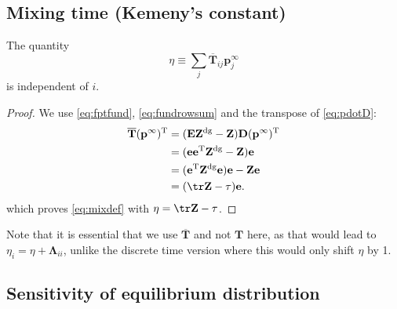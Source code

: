 \documentclass[12pt]{article}
\newcommand{\dg}{^\mathrm{dg}}
\newcommand{\trans}{^\mathrm{T}}
\newcommand{\onev}{\mathbf{e}}
\newcommand{\onem}{\mathbf{E}}
\newcommand{\eq}{\mathbf{p}^\infty}
\newcommand{\fpt}{\mathbf{T}}
\newcommand{\fptb}{\overline{\fpt}}
\newcommand{\fund}{\mathbf{Z}}
\newcommand{\D}{\mathbf{D}}
\newcommand{\Lb}{\boldsymbol{\Lambda}}
\begin{document}
\subsection{Mixing time (Kemeny's constant)}\label{sec:mixtime}

\begin{thm}\label{th:kemenyconst}
  The quantity
  \begin{equation}\label{eq:mixdef}
    \eta \equiv \sum_j \fptb_{ij}\eq_j
  \end{equation}
  is independent of $i$.
\end{thm}
\begin{proof}
  We use \eqref{eq:fptfund}, \eqref{eq:fundrowsum} and the transpose of \eqref{eq:pdotD}:
  \begin{equation*}
    \begin{aligned}
      \fptb (\eq)\trans &= (\onem\fund\dg - \fund) \D (\eq)\trans \\
        &= (\onev\onev\trans\fund\dg - \fund) \onev \\
        &= (\onev\trans\fund\dg\onev)\onev - \fund\onev \\
        &= (\tr\fund - \tau)\onev.
    \end{aligned}
  \end{equation*}
  which proves \eqref{eq:mixdef} with $\eta = \tr\fund - \tau$.
\end{proof}

Note that it is essential that we use $\fptb$ and not $\fpt$ here, as that would lead to $\eta_i=\eta+\Lb_{ii}$, unlike the discrete time version \cite{hunter2006mixing} where this would only shift $\eta$ by 1.

\subsection{Sensitivity of equilibrium distribution}\label{sec:sensitivity}
\end{document}
